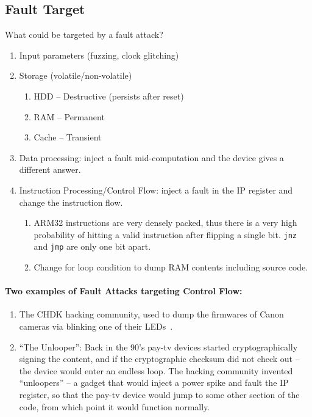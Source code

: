 \subsection{Fault Target}\label{subsec:fault_targets}
What could be targeted by a fault attack?
\begin{enumerate}
	\item Input parameters (fuzzing, clock glitching)
	\item Storage (volatile/non-volatile)
	\begin{enumerate}
		\item HDD -- Destructive (persists after reset)
		\item RAM -- Permanent
		\item Cache -- Transient
	\end{enumerate}
	\item Data processing: inject a fault mid-computation and the device gives a different answer.
	\item Instruction Processing/Control Flow: inject a fault in the IP register and change the instruction flow.
	\begin{enumerate}
		\item ARM32 instructions are very densely packed, thus there is a very high probability of hitting a valid instruction after flipping a single bit. \texttt{jnz} and \texttt{jmp} are only one bit apart.
		\item Change for loop condition to dump RAM contents including source code.
	\end{enumerate}
\end{enumerate}

\paragraph{Two examples of Fault Attacks targeting Control Flow:}
\begin{enumerate}
	\item The CHDK hacking community, used to dump the firmwares of Canon cameras via blinking one of their LEDs~\cite{chdk, canon}.

	\item ``The Unlooper'': Back in the 90's pay-tv devices started cryptographically signing the content, and if the cryptographic checksum did not check out -- the device would enter an endless loop. The hacking community invented ``unloopers'' -- a gadget that would inject a power spike and fault the IP register, so that the pay-tv device would jump to some other section of the code, from which point it would function normally.
\end{enumerate}

